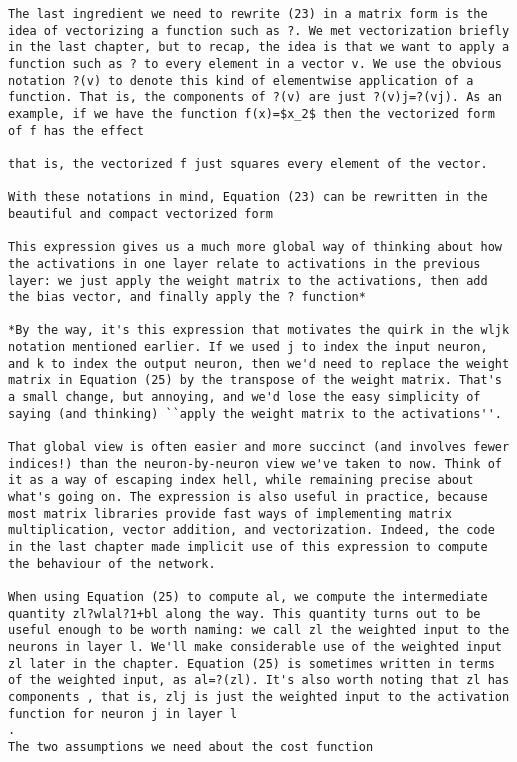 \begin{lstlisting}
The last ingredient we need to rewrite (23) in a matrix form is the idea of vectorizing a function such as ?. We met vectorization briefly in the last chapter, but to recap, the idea is that we want to apply a function such as ? to every element in a vector v. We use the obvious notation ?(v) to denote this kind of elementwise application of a function. That is, the components of ?(v) are just ?(v)j=?(vj). As an example, if we have the function f(x)=$x_2$ then the vectorized form of f has the effect 

that is, the vectorized f just squares every element of the vector.

With these notations in mind, Equation (23) can be rewritten in the beautiful and compact vectorized form 

This expression gives us a much more global way of thinking about how the activations in one layer relate to activations in the previous layer: we just apply the weight matrix to the activations, then add the bias vector, and finally apply the ? function* 

*By the way, it's this expression that motivates the quirk in the wljk notation mentioned earlier. If we used j to index the input neuron, and k to index the output neuron, then we'd need to replace the weight matrix in Equation (25) by the transpose of the weight matrix. That's a small change, but annoying, and we'd lose the easy simplicity of saying (and thinking) ``apply the weight matrix to the activations''.

That global view is often easier and more succinct (and involves fewer indices!) than the neuron-by-neuron view we've taken to now. Think of it as a way of escaping index hell, while remaining precise about what's going on. The expression is also useful in practice, because most matrix libraries provide fast ways of implementing matrix multiplication, vector addition, and vectorization. Indeed, the code in the last chapter made implicit use of this expression to compute the behaviour of the network.

When using Equation (25) to compute al, we compute the intermediate quantity zl?wlal?1+bl along the way. This quantity turns out to be useful enough to be worth naming: we call zl the weighted input to the neurons in layer l. We'll make considerable use of the weighted input zl later in the chapter. Equation (25) is sometimes written in terms of the weighted input, as al=?(zl). It's also worth noting that zl has components , that is, zlj is just the weighted input to the activation function for neuron j in layer l
.
The two assumptions we need about the cost function


\end{lstlisting}
